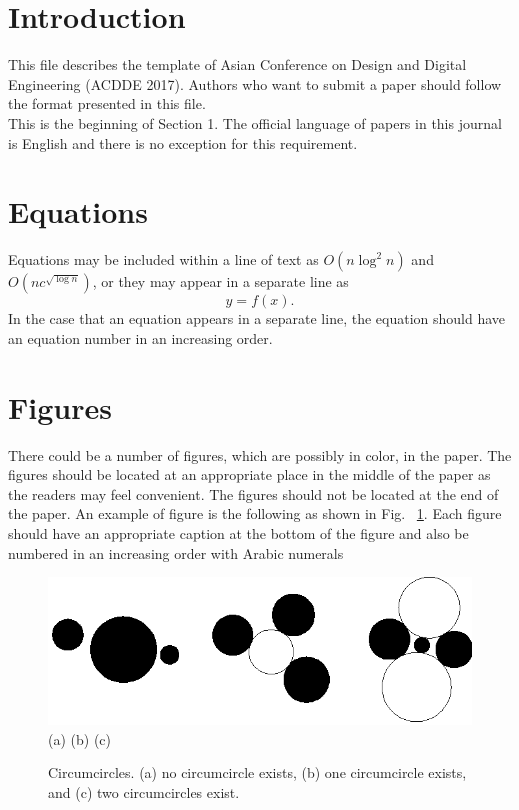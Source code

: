 \documentclass[10pt]{article}
\begin{document}
\section{Introduction}
This file describes the template of Asian Conference on Design and Digital Engineering (ACDDE 2017). Authors who want to submit a paper should follow the format presented in this file.\\
This is the beginning of Section 1. The official language of papers in this journal is English and there is no exception for this requirement.


\section{Equations} %
Equations may be included within a line of text as $O(n \log ^2 n)$
and $O(nc^{\sqrt{\log n}})$, or they may appear in a separate line as
\begin{equation}
y = f(x).
\end{equation}
In the case that an equation appears in a separate line,
the equation should have an equation number in an increasing order.


\section{Figures}
There could be a number of figures, which are possibly in color, in the paper. The figures should be located at an appropriate place in the middle of the paper as the readers may feel convenient. The figures should not be located at the end of the paper. An example of figure is the following as shown in Fig. ~\ref{fig1}. Each figure should have an appropriate caption at the bottom of the figure and also be numbered in an increasing order with Arabic numerals

\begin{figure}[htb]
\begin{center}
\includegraphics[width=0.6\columnwidth]{fig1.eps}\\
(a) \hspace{2cm} (b)\hspace{2cm} (c)
\caption{Circumcircles. (a) no circumcircle exists, (b) one
circumcircle exists, and (c) two circumcircles exist.}
\label{fig1}
\end{center}
\end{figure}
\end{document}
